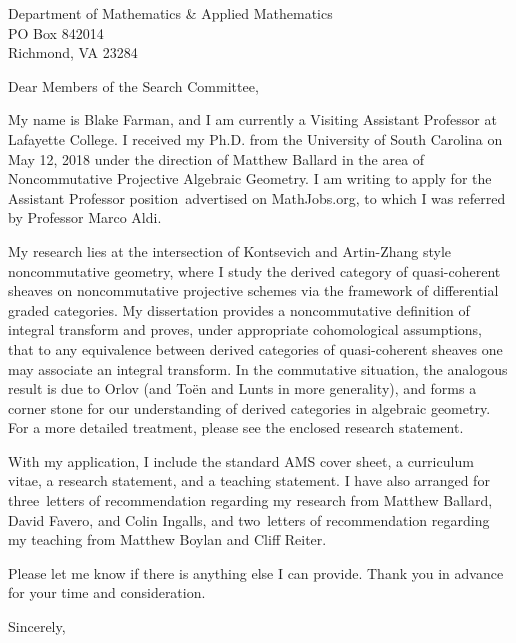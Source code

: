 \documentclass[11pt]{letter}
\date{\today}
\def\position{Assistant Professor position}
\def\posloc{MathJobs.org}
\def\materials{the standard AMS cover sheet,
  a curriculum vitae,
  a research statement,
  and a teaching statement}
\def\numresrefs{three}
\def\numteachrefs{two}
\def\refs{Matthew Ballard,
  David Favero,
  and Colin Ingalls}
\def\teachingrefs{Matthew Boylan and Cliff Reiter}
\def\ReferencesBlurbListOnly{I have also provided contact information for \numresrefs\ letters of recommendation regarding my research from \refs, and \numteachrefs\ letters of recommendation regarding my teaching from \teachingrefs.}
\def\ReferencesBlurbBoth{I have also arranged for \numresrefs\  letters of recommendation regarding my research from \refs, and \numteachrefs\ letters of recommendation regarding my teaching from \teachingrefs.}
\def\ReferencesBlurbResearchOnly{
  I have also arranged for \numresrefs\ letters of recommendation regarding my research from \refs.}
\def\researchblurb{My research lies at the intersection of Kontsevich and Artin-Zhang style noncommutative geometry, where I study the derived category of quasi-coherent sheaves on noncommutative projective schemes via the framework of differential graded categories.
  My dissertation provides a noncommutative definition of integral transform and proves, under appropriate cohomological assumptions, that to any equivalence between derived categories of quasi-coherent sheaves one may associate an integral transform.
  In the commutative situation, the analogous result is due to Orlov (and To\"{e}n and Lunts in more generality), and forms a corner stone for our understanding of derived categories in algebraic geometry.
  For a more detailed treatment, please see the enclosed research statement.}
\def\teachingblurb{As an instructor, I have a deep appreciation for the beauty and power of mathematics that I am always excited to share with students.
  I have a wealth of experience as instructor of record for undergraduate courses ranging from college algebra to calculus II, as well as guest lectures, seminars, and colloquium talks aimed at the graduate level.
  
}
\begin{document}
\begin{letter}{
    Department of Mathematics \& Applied Mathematics\\
    PO Box 842014\\
    Richmond, VA 23284\\
}
  \opening{Dear Members of the Search Committee,}
  
  My name is Blake Farman, and I am currently a Visiting Assistant Professor at Lafayette College.
  I received my Ph.D. from the University of South Carolina on May 12, 2018 under the direction of Matthew Ballard in the area of Noncommutative Projective Algebraic Geometry.
  I am writing to apply for the \position\ advertised on \posloc, to which I was referred by Professor Marco Aldi.

  \researchblurb

  
  With my application, I include \materials.
  \ReferencesBlurbBoth

  Please let me know if there is anything else I can provide.
  Thank you in advance for your time and consideration.
  \closing{Sincerely,}
\end{letter}
\end{document}
